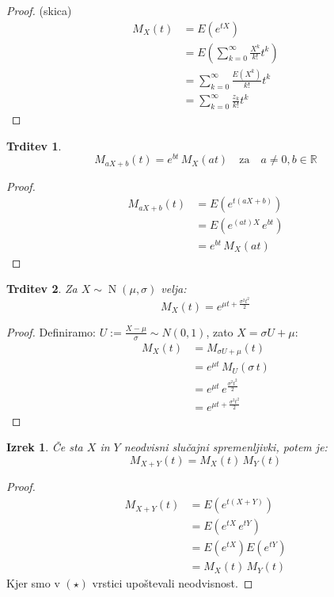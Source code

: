 \documentclass[12pt]{book}
\theoremstyle{definition}
\theoremstyle{plain}
\newtheorem{izrek}{Izrek}
\theoremstyle{plain}
\newtheorem{trditev}{Trditev}
\theoremstyle{plain}
\theoremstyle{remark}
\begin{document}
\begin{proof}(skica)
    $$
    \begin{aligned}
        M_X(t)&=E\left(e^{t X}\right) \\
        &=E\left(\sum_{k=0}^{\infty} \frac{X^k}{k !}  t^k\right) \\
        &=\sum_{k=0}^{\infty} \frac{E\left(X^k\right)}{k !} t^k \\
        &=\sum_{k=0}^{\infty} \frac{z_k}{k !} t^k
    \end{aligned}
    $$
\end{proof}

\begin{trditev}
    $$
    M_{a X+b}(t)=e^{b t} \, M_X(a t) \quad \text{za} \quad a \neq 0, b \in \mathbb{R}
    $$
\end{trditev}

\begin{proof}
    $$
    \begin{aligned}
        M_{a X+b}(t)&=E\left(e^{t(a X+b)}\right) \\
        &=E\left(e^{(a t) X} \, e^{b t}\right) \\
        &=e^{b t} \, M_X(a t)
    \end{aligned}
    $$
\end{proof}

\begin{trditev}
    Za $X \sim \operatorname{N}(\mu, \sigma)$ velja: 
    $$
    M_X(t)=e^{\mu t+\frac{\sigma^2 t^2}{2}}
    $$
\end{trditev}

\begin{proof}
    Definiramo: $U:=\frac{X-\mu}{\sigma} \sim N(0,1)$, zato $X=\sigma U+\mu$:
    $$
    \begin{aligned}
        M_X(t)&=M_{\sigma U+\mu}(t) \\
        &=e^{\mu t} \, M_U(\sigma\, t) \\
        &=e^{\mu t} \, e^{\frac{\sigma^2 t^2}{2}} \\
        &=e^{\mu t+\frac{\sigma^2 t^2}{2}}
    \end{aligned}
    $$
\end{proof}

\begin{izrek}
    Če sta $X$ in $Y$ neodvisni slučajni spremenljivki, potem je:
    $$
    M_{X+Y}(t)=M_X(t) \, M_Y(t)
    $$
\end{izrek}

\begin{proof}
    \begin{align*}
        M_{X+Y}(t)&=E\left(e^{t (X+Y)}\right) \\
        &=E\left(e^{t X} \, e^{t  Y}\right) \tag{$\star$} \\
        &=E\left(e^{t X}\right) E\left(e^{tY}\right) \\
        &=M_X(t) \, M_Y(t)
    \end{align*}
    Kjer smo v $(\star)$ vrstici upoštevali neodvisnost.
\end{proof}
\end{document}
